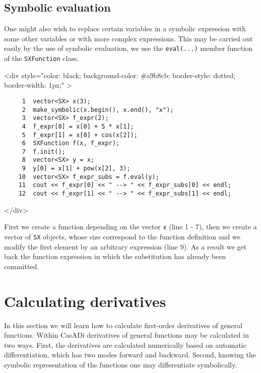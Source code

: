 \documentclass[a4paper,12pt]{book}
\newcommand{\codebegin}{
\begin{rawhtml}
<div style="color: black; background-color: \#a9b8cb;  border-style: dotted; border-width: 1px;" >
\end{rawhtml}
}
\newcommand{\codeend}{
\begin{rawhtml}
</div>
\end{rawhtml}
}
\newcommand{\codebegin}{

}
\newcommand{\codeend}{

}
\begin{document}
{ \subsection*{Symbolic evaluation}
 \par\noindent
 One might also wish to replace certain variables in a symbolic expression with some other variables
  or with more complex expressions. This may be carried out easily by the use of symbolic evaluation, we use
  the \texttt{eval(...)} member function of the \texttt{SXFunction} class.
\par
\codebegin
\begin{verbatim}
     1  vector<SX> x(3);
     2  make_symbolic(x.begin(), x.end(), "x");
     3  vector<SX> f_expr(2);
     4  f_expr[0] = x[0] + 5 * x[1];
     5  f_expr[1] = x[0] + cos(x[2]);
     6  SXFunction f(x, f_expr);
     7  f.init();
     8  vector<SX> y = x;
     9  y[0] = x[1] + pow(x[2], 3);
    10  vector<SX> f_expr_subs = f.eval(y);
    11  cout << f_expr[0] << " --> " << f_expr_subs[0] << endl;
    12  cout << f_expr[1] << " --> " << f_expr_subs[1] << endl;
\end{verbatim}
\codeend
First we create a function depending on the vector \texttt{x} (line 1 \-- 7), then we create a vector of \texttt{SX} objects, whose
size correspond to the function definition and we modify the first element by an arbitrary expression (line 9). As a result we get
back the function expression in which the substitution has already been committed.
\section{Calculating derivatives}
In this section we will learn how to calculate first-order derivatives of general functions. Within CasADi derivatives of general
functions may be calculated in two ways. First, the derivatives are calculated numerically based on automatic differentiation,
 which has two modes forward and backward. Second, knowing the symbolic representation of the functions one may differentiate
 symbolically.

}
\end{document}
